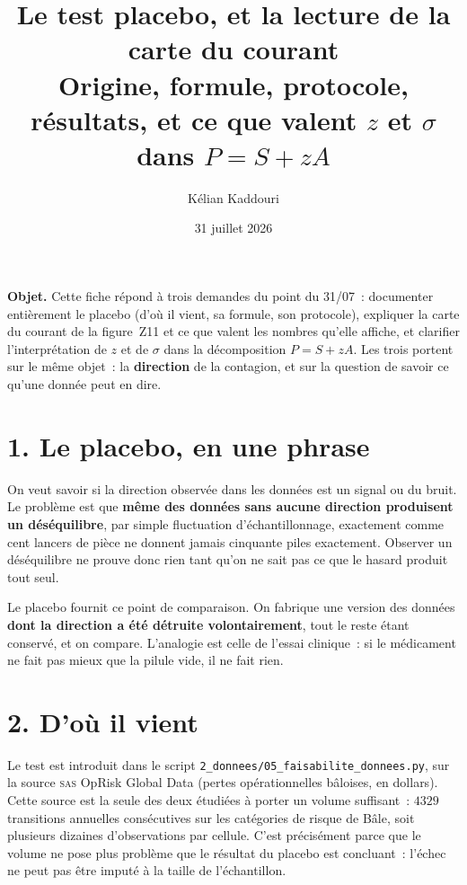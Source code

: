\documentclass[11pt,a4paper]{article}
\title{\vspace{-1.2cm}\color{navy}\bfseries Le test placebo, et la lecture de la carte du courant\\[2pt]
  \large Origine, formule, protocole, résultats, et ce que valent $z$ et $\sigma$
  dans $P=S+zA$}
\author{Kélian Kaddouri}
\date{31 juillet 2026}
\begin{document}
\maketitle
\vspace{-0.9cm}

\begin{cle}
\textbf{Objet.} Cette fiche répond à trois demandes du point du 31/07~: documenter
entièrement le placebo (d'où il vient, sa formule, son protocole), expliquer la carte du
courant de la figure~Z11 et ce que valent les nombres qu'elle affiche, et clarifier
l'interprétation de $z$ et de $\sigma$ dans la décomposition $P=S+zA$. Les trois portent
sur le même objet~: la \textbf{direction} de la contagion, et sur la question de savoir ce
qu'une donnée peut en dire.
\end{cle}

\section*{1. Le placebo, en une phrase}

On veut savoir si la direction observée dans les données est un signal ou du bruit. Le
problème est que \textbf{même des données sans aucune direction produisent un déséquilibre},
par simple fluctuation d'échantillonnage, exactement comme cent lancers de pièce ne donnent
jamais cinquante piles exactement. Observer un déséquilibre ne prouve donc rien tant qu'on
ne sait pas ce que le hasard produit tout seul.

Le placebo fournit ce point de comparaison. On fabrique une version des données
\textbf{dont la direction a été détruite volontairement}, tout le reste étant conservé, et
on compare. L'analogie est celle de l'essai clinique~: si le médicament ne fait pas mieux
que la pilule vide, il ne fait rien.

\section*{2. D'où il vient}

Le test est introduit dans le script \texttt{2\_donnees/05\_faisabilite\_donnees.py}, sur la
source \textsc{sas} OpRisk Global Data (pertes opérationnelles bâloises, en dollars). Cette
source est la seule des deux étudiées à porter un volume suffisant~: $4329$ transitions
annuelles consécutives sur les catégories de risque de Bâle, soit plusieurs dizaines
d'observations par cellule. C'est précisément parce que le volume ne pose plus problème que
le résultat du placebo est concluant~: l'échec ne peut pas être imputé à la taille de
l'échantillon.
\end{document}
